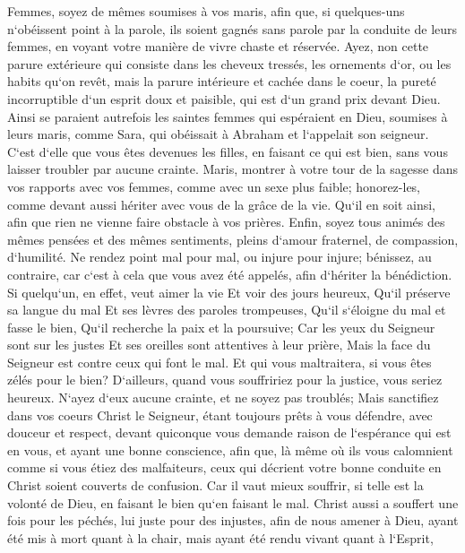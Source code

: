 \verse Femmes, soyez de mêmes soumises à vos maris, afin que, si quelques-uns n`obéissent point à la parole, ils soient gagnés sans parole par la conduite de leurs femmes, 
\verse en voyant votre manière de vivre chaste et réservée. 
\verse Ayez, non cette parure extérieure qui consiste dans les cheveux tressés, les ornements d`or, ou les habits qu`on revêt, 
\verse mais la parure intérieure et cachée dans le coeur, la pureté incorruptible d`un esprit doux et paisible, qui est d`un grand prix devant Dieu. 
\verse Ainsi se paraient autrefois les saintes femmes qui espéraient en Dieu, soumises à leurs maris, 
\verse comme Sara, qui obéissait à Abraham et l`appelait son seigneur. C`est d`elle que vous êtes devenues les filles, en faisant ce qui est bien, sans vous laisser troubler par aucune crainte. 
\verse Maris, montrer à votre tour de la sagesse dans vos rapports avec vos femmes, comme avec un sexe plus faible; honorez-les, comme devant aussi hériter avec vous de la grâce de la vie. Qu`il en soit ainsi, afin que rien ne vienne faire obstacle à vos prières. 
\verse Enfin, soyez tous animés des mêmes pensées et des mêmes sentiments, pleins d`amour fraternel, de compassion, d`humilité. 
\verse Ne rendez point mal pour mal, ou injure pour injure; bénissez, au contraire, car c`est à cela que vous avez été appelés, afin d`hériter la bénédiction. 
\verse Si quelqu`un, en effet, veut aimer la vie Et voir des jours heureux, Qu`il préserve sa langue du mal Et ses lèvres des paroles trompeuses, 
\verse Qu`il s`éloigne du mal et fasse le bien, Qu`il recherche la paix et la poursuive; 
\verse Car les yeux du Seigneur sont sur les justes Et ses oreilles sont attentives à leur prière, Mais la face du Seigneur est contre ceux qui font le mal. 
\verse Et qui vous maltraitera, si vous êtes zélés pour le bien? 
\verse D`ailleurs, quand vous souffririez pour la justice, vous seriez heureux. N`ayez d`eux aucune crainte, et ne soyez pas troublés; 
\verse Mais sanctifiez dans vos coeurs Christ le Seigneur, étant toujours prêts à vous défendre, avec douceur et respect, devant quiconque vous demande raison de l`espérance qui est en vous, 
\verse et ayant une bonne conscience, afin que, là même où ils vous calomnient comme si vous étiez des malfaiteurs, ceux qui décrient votre bonne conduite en Christ soient couverts de confusion. 
\verse Car il vaut mieux souffrir, si telle est la volonté de Dieu, en faisant le bien qu`en faisant le mal. 
\verse Christ aussi a souffert une fois pour les péchés, lui juste pour des injustes, afin de nous amener à Dieu, ayant été mis à mort quant à la chair, mais ayant été rendu vivant quant à l`Esprit, 
